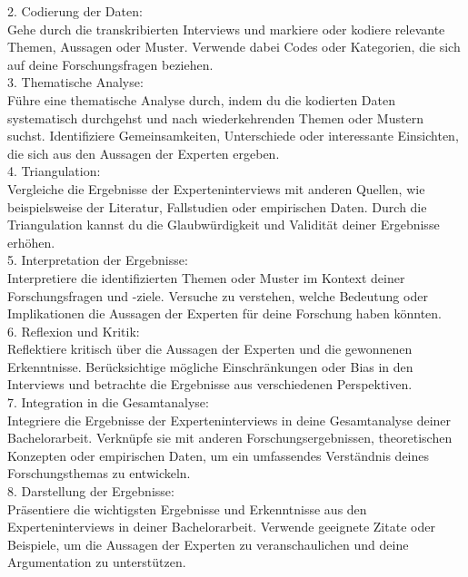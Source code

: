 2. Codierung der Daten:\\
Gehe durch die transkribierten Interviews und markiere oder kodiere relevante Themen, Aussagen oder Muster. Verwende dabei Codes oder Kategorien, die sich auf deine Forschungsfragen beziehen.\\

3. Thematische Analyse:\\
Führe eine thematische Analyse durch, indem du die kodierten Daten systematisch durchgehst und nach wiederkehrenden Themen oder Mustern suchst. Identifiziere Gemeinsamkeiten, Unterschiede oder interessante Einsichten, die sich aus den Aussagen der Experten ergeben.\\

4. Triangulation:\\
Vergleiche die Ergebnisse der Experteninterviews mit anderen Quellen, wie beispielsweise der Literatur, Fallstudien oder empirischen Daten. Durch die Triangulation kannst du die Glaubwürdigkeit und Validität deiner Ergebnisse erhöhen.\\

5. Interpretation der Ergebnisse:\\
Interpretiere die identifizierten Themen oder Muster im Kontext deiner Forschungsfragen und -ziele. Versuche zu verstehen, welche Bedeutung oder Implikationen die Aussagen der Experten für deine Forschung haben könnten.\\

6. Reflexion und Kritik:\\
Reflektiere kritisch über die Aussagen der Experten und die gewonnenen Erkenntnisse. Berücksichtige mögliche Einschränkungen oder Bias in den Interviews und betrachte die Ergebnisse aus verschiedenen Perspektiven.\\

7. Integration in die Gesamtanalyse:\\
Integriere die Ergebnisse der Experteninterviews in deine Gesamtanalyse deiner Bachelorarbeit. Verknüpfe sie mit anderen Forschungsergebnissen, theoretischen Konzepten oder empirischen Daten, um ein umfassendes Verständnis deines Forschungsthemas zu entwickeln.\\

8. Darstellung der Ergebnisse:\\
Präsentiere die wichtigsten Ergebnisse und Erkenntnisse aus den Experteninterviews in deiner Bachelorarbeit. Verwende geeignete Zitate oder Beispiele, um die Aussagen der Experten zu veranschaulichen und deine Argumentation zu unterstützen.
\cite{maguire2002user}

